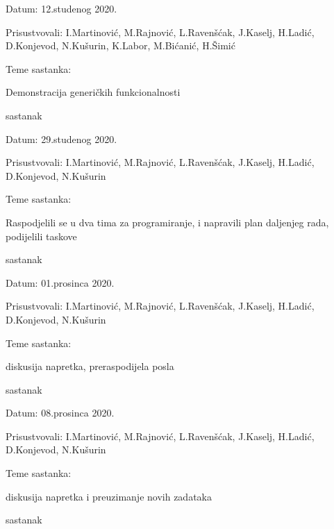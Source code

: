 \begin{packed_enum}
	\item[] \begin{packed_item}
		\item Datum: 12.studenog 2020.
		\item Prisustvovali: I.Martinović, M.Rajnović, L.Ravenšćak, J.Kaselj, H.Ladić, D.Konjevod, N.Kušurin, K.Labor, M.Bićanić, H.Šimić
		\item Teme sastanka: 
		\begin{packed_item}
			\item   Demonstracija generičkih funkcionalnosti
		\end{packed_item}
	\end{packed_item}
		            \item sastanak
		\item[] \begin{packed_item}
			\item Datum: 29.studenog 2020.
			\item Prisustvovali: I.Martinović, M.Rajnović, L.Ravenšćak, J.Kaselj, H.Ladić, D.Konjevod, N.Kušurin
			\item Teme sastanka: 
			\begin{packed_item}
				\item   Raspodjelili se u dva tima za programiranje, i napravili plan daljenjeg rada, podijelili taskove
			\end{packed_item}
		\end{packed_item}
	
		            \item sastanak
		            
		\item[] \begin{packed_item}
			\item Datum: 01.prosinca 2020.
			\item Prisustvovali: I.Martinović, M.Rajnović, L.Ravenšćak, J.Kaselj, H.Ladić, D.Konjevod, N.Kušurin
			\item Teme sastanka: 
			\begin{packed_item}
				\item   diskusija napretka, preraspodijela posla
			\end{packed_item}
		\end{packed_item}
			\item sastanak
			
			\item[] \begin{packed_item}
			\item Datum: 08.prosinca 2020.
			\item Prisustvovali: I.Martinović, M.Rajnović, L.Ravenšćak, J.Kaselj, H.Ladić, D.Konjevod, N.Kušurin
			\item Teme sastanka: 
			\begin{packed_item}
				\item   diskusija napretka i preuzimanje novih zadataka
			\end{packed_item}
		\end{packed_item}
			\item sastanak
			

\end{packed_enum}
